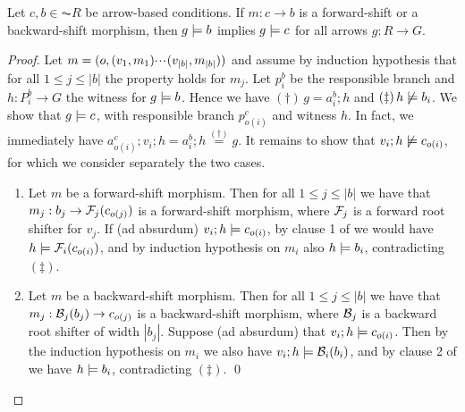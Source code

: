 \begin{proposition}
Let $c,b \in \AC{R}$  be arrow-based conditions. If $m:c\to b$ is a forward-shift or a backward-shift morphism, then $g\models b$ implies $g \models c$ for all arrows $g:R\to G$. 
\end{proposition}
%
\begin{fullorname}
\begin{proof}
Let $m = (o,(v_1,m_1){\cdotp\mkern-2mu\cdotp\mkern-2mu\cdotp\mkern1mu} (v_{|b|},m_{|b|}))$ and assume by induction hypothesis that for all $1\leq j\leq |b|$ the property holds for $m_j$. Let $p^b_i$ be the responsible branch and $h: P^b_i \to G$ the witness for $g\models b$. 
Hence we have $(\dagger)\, g=a^b_i;h$ and $(\ddagger)\, h \not\models b_i$.  
We show that $g \models c$, with responsible branch $p^c_{o(i)}$ and witness $h$. In fact, we immediately have  $a^c_{o(i)}; v_i ;h = a^b_i ; h \stackrel{(\dagger)}{=} g$. It remains to show that $v_i ;h \not\models c_{o(i)}$, for which we consider separately the two cases.
\begin{enumerate}
\item Let $m$ be a forward-shift morphism. Then for all $1\leq j\leq |b|$ we have that   $m_j:b_j \rightarrow \mathcal{F}_j(c_{o(j)})$ is a forward-shift morphism, where $\mathcal{F}_j$ is a forward root shifter for $v_j$. If (ad absurdum) $v_i ;h \models c_{o(i)}$, by clause 1 of  we would have $h \models \mathcal{F}_i(c_{o(i)})$, and by induction hypothesis on $m_i$ also $h \models b_i$, contradicting $(\ddagger)$.

\item Let $m$ be a backward-shift morphism. Then for all $1\leq j\leq |b|$ we have that  $m_j:\mathcal{B}_j(b_j) \rightarrow c_{o(j)}$ is a backward-shift morphism, where $\mathcal{B}_j$ is a backward root shifter of width $|b_j|$.
Suppose (ad absurdum) that $v_i ;h \models c_{o(i)}$. Then by the induction hypothesis on $m_i$ we also have $v_i ;h \models \mathcal{B}_i(b_i)$, and by clause 2 of  we  have $h \models b_i$, contradicting $(\ddagger)$.
\qed
\end{enumerate}
\end{proof}
\end{fullorname}

